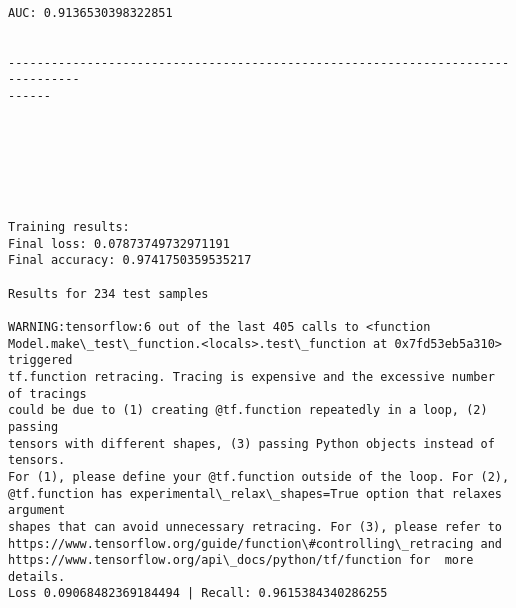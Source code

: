 \documentclass[11pt]{article}
\begin{document}
    \begin{center}
    \end{center}
    { \hspace*{\fill} \\}
    
    \begin{Verbatim}[commandchars=\\\{\}]
AUC: 0.9136530398322851


--------------------------------------------------------------------------------
------


    \end{Verbatim}

    \begin{center}
    \end{center}
    { \hspace*{\fill} \\}
    
    \begin{center}
    \end{center}
    { \hspace*{\fill} \\}
    
    \begin{Verbatim}[commandchars=\\\{\}]

Training results:
Final loss: 0.07873749732971191
Final accuracy: 0.9741750359535217

Results for 234 test samples

WARNING:tensorflow:6 out of the last 405 calls to <function
Model.make\_test\_function.<locals>.test\_function at 0x7fd53eb5a310> triggered
tf.function retracing. Tracing is expensive and the excessive number of tracings
could be due to (1) creating @tf.function repeatedly in a loop, (2) passing
tensors with different shapes, (3) passing Python objects instead of tensors.
For (1), please define your @tf.function outside of the loop. For (2),
@tf.function has experimental\_relax\_shapes=True option that relaxes argument
shapes that can avoid unnecessary retracing. For (3), please refer to
https://www.tensorflow.org/guide/function\#controlling\_retracing and
https://www.tensorflow.org/api\_docs/python/tf/function for  more details.
Loss 0.09068482369184494 | Recall: 0.9615384340286255



    \end{Verbatim}
\end{document}
